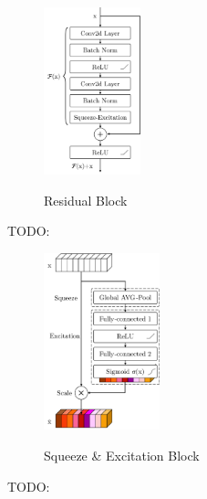 \begin{figure}
    \includegraphics[width=0.25\textwidth]{res/pictures/res-block.pdf}
    \centering
    \caption[Residual Block]{\unskip}
    Residual Block
    \label{fig:resblock}
\end{figure}

TODO:

\begin{figure}
    \centering
    \includegraphics[width=0.3\textwidth]{res/pictures/squeeze-and-excitation-block.pdf}
    \caption[Squeeze \& Excitation Block]{\unskip}
    Squeeze \& Excitation Block
    \label{fig:squeeze-and-excitation-block}
\end{figure}

TODO:

\pagebreak

